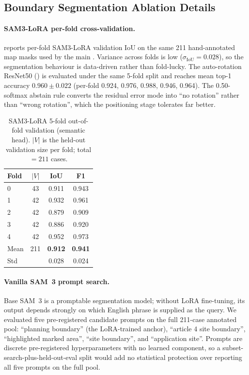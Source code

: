 \documentclass[11pt]{article}
\begin{document}
\subsection{Boundary Segmentation Ablation Details}
\label{subsection:abl-segmentation-details}

\paragraph{SAM3-LoRA per-fold cross-validation.}
 reports per-fold SAM3-LoRA validation IoU on the same 211 hand-annotated map masks used by the main . Variance across folds is low ($\sigma_{\text{IoU}} = 0.028$), so the segmentation behaviour is data-driven rather than fold-lucky. The auto-rotation ResNet50 () is evaluated under the same 5-fold split and reaches mean top-1 accuracy $0.960 \pm 0.022$ (per-fold 0.924, 0.976, 0.988, 0.946, 0.964). The 0.50-softmax abstain rule converts the residual error mode into ``no rotation'' rather than ``wrong rotation'', which the positioning stage tolerates far better.

\begin{table}[h]
\centering
\small
\begin{tabular}{@{}lccc@{}}
\toprule
\textbf{Fold} & \textbf{$|V|$} & \textbf{IoU} & \textbf{F1} \\ \midrule
0    & 43 & 0.911 & 0.943 \\
1    & 42 & 0.932 & 0.961 \\
2    & 42 & 0.879 & 0.909 \\
3    & 42 & 0.886 & 0.920 \\
4    & 42 & 0.952 & 0.973 \\ \midrule
Mean & 211 & \textbf{0.912} & \textbf{0.941} \\
Std  &    & 0.028 & 0.024 \\ \bottomrule
\end{tabular}
\caption{SAM3-LoRA 5-fold out-of-fold validation (semantic head). $|V|$ is the held-out validation size per fold; total $= 211$ cases.}
\label{tab:sam3-cv}
\end{table}

\paragraph{Vanilla SAM~3 prompt search.}
\label{subsection:abl-vanilla-sam-prompt-search}
Base SAM~3 is a promptable segmentation model; without LoRA fine-tuning, its output depends strongly on which English phrase is supplied as the query. We evaluated five pre-registered candidate prompts on the full 211-case annotated pool: ``planning boundary'' (the LoRA-trained anchor), ``article 4 site boundary'', ``highlighted marked area'', ``site boundary'', and ``application site''. Prompts are discrete pre-registered hyperparameters with no learned component, so a subset-search-plus-held-out-eval split would add no statistical protection over reporting all five prompts on the full pool.
\end{document}
